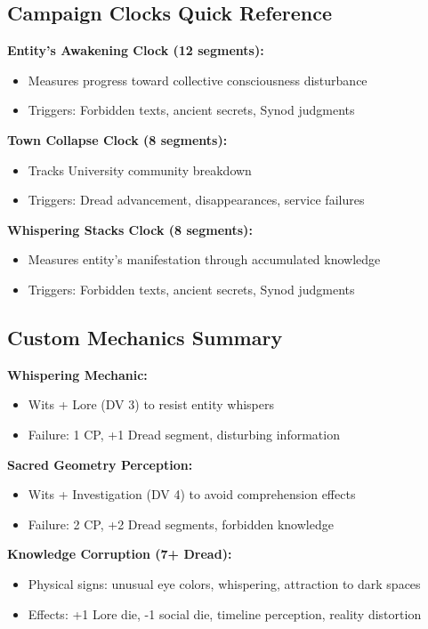 \documentclass[11pt]{article}
\begin{document}
\subsection*{Campaign Clocks Quick Reference}

\textbf{Entity's Awakening Clock (12 segments):}
\begin{itemize}
\item Measures progress toward collective consciousness disturbance
\item Triggers: Forbidden texts, ancient secrets, Synod judgments
\end{itemize}

\textbf{Town Collapse Clock (8 segments):}
\begin{itemize}
\item Tracks University community breakdown
\item Triggers: Dread advancement, disappearances, service failures
\end{itemize}

\textbf{Whispering Stacks Clock (8 segments):}
\begin{itemize}
\item Measures entity's manifestation through accumulated knowledge
\item Triggers: Forbidden texts, ancient secrets, Synod judgments
\end{itemize}

\subsection*{Custom Mechanics Summary}

\textbf{Whispering Mechanic:}
\begin{itemize}
\item Wits + Lore (DV 3) to resist entity whispers
\item Failure: 1 CP, +1 Dread segment, disturbing information
\end{itemize}

\textbf{Sacred Geometry Perception:}
\begin{itemize}
\item Wits + Investigation (DV 4) to avoid comprehension effects
\item Failure: 2 CP, +2 Dread segments, forbidden knowledge
\end{itemize}

\textbf{Knowledge Corruption (7+ Dread):}
\begin{itemize}
\item Physical signs: unusual eye colors, whispering, attraction to dark spaces
\item Effects: +1 Lore die, -1 social die, timeline perception, reality distortion
\end{itemize}
\end{document}

